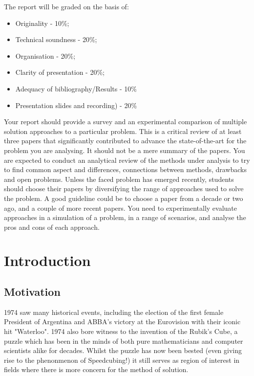 \documentclass[UKenglish]{libraries/svproc}
\begin{document}
The report will be graded on the basis of:

\begin{itemize}
\item Originality - 10\%;
\item Technical soundness - 20\%;
\item Organisation - 20\%;
\item Clarity of presentation - 20\%;
\item Adequacy of bibliography/Results - 10\%
\item Presentation slides and recording) - 20\%
\end{itemize}





Your report should provide a survey and an experimental comparison of multiple solution approaches to a particular problem. This is a critical review of at least three papers that significantly contributed to advance the state-of-the-art for the problem you are analysing. It should not be a mere summary of the papers. You are expected to conduct an analytical review of the methods under analysis to try to find common aspect and differences, connections between methods, drawbacks and open problems. Unless the faced problem has emerged recently, students should choose their papers by diversifying the range of approaches used to solve the problem. A good guideline could be to choose a paper from a decade or two ago, and a couple of more recent papers. You need to experimentally evaluate approaches in a simulation of a problem, in a range of scenarios, and analyse the pros and cons of each approach. 
\fi

\section{Introduction}
\subsection{Motivation}
1974 saw many historical events, including the election of the first female President of Argentina and ABBA's victory at the Eurovision with their iconic hit "Waterloo". 1974 also bore witness to the invention of the Rubik's Cube, a puzzle which has been in the minds of both pure mathematicians and computer scientists alike for decades. Whilst the puzzle has now been bested (even giving rise to the phenonmenon of Speedcubing!) it still serves as region of interest in fields where there is more concern for the method of solution.
\end{document}
